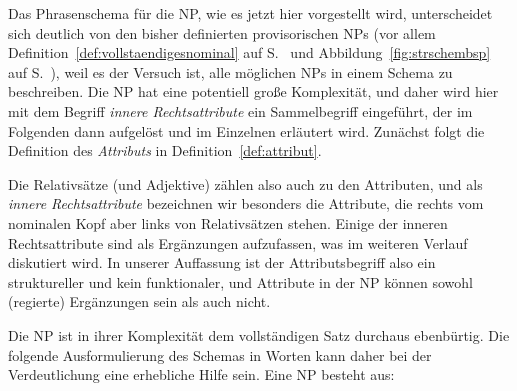 Das Phrasenschema für die NP, wie es jetzt hier vorgestellt wird, unterscheidet sich deutlich von den bisher definierten provisorischen NPs (vor allem Definition~\ref{def:vollstaendigesnominal} auf S.~\pageref{def:vollstaendigesnominal} und Abbildung~\ref{fig:strschembsp} auf S.~\pageref{fig:strschembsp}), weil es der Versuch ist, alle möglichen NPs in einem Schema zu beschreiben.
Die NP hat eine potentiell große Komplexität, und daher wird hier mit dem Begriff \textit{innere Rechtsattribute} ein Sammelbegriff eingeführt, der im Folgenden dann aufgelöst und im Einzelnen erläutert wird.
Zunächst folgt die Definition des \textit{Attributs} in Definition~\ref{def:attribut}.


Die Relativsätze (und Adjektive) zählen also auch zu den Attributen, und als \textit{innere Rechtsattribute} bezeichnen wir besonders die Attribute, die rechts vom nominalen Kopf aber links von Relativsätzen stehen.
Einige der inneren Rechtsattribute sind als Ergänzungen aufzufassen, was im weiteren Verlauf diskutiert wird.
In unserer Auffassung ist der Attributsbegriff also ein struktureller und kein funktionaler, und Attribute in der NP können sowohl (regierte) Ergänzungen sein als auch nicht. 



Die NP ist in ihrer Komplexität dem vollständigen Satz durchaus ebenbürtig.
Die folgende Ausformulierung des Schemas in Worten kann daher bei der Verdeutlichung eine erhebliche Hilfe sein.
Eine NP besteht aus:


